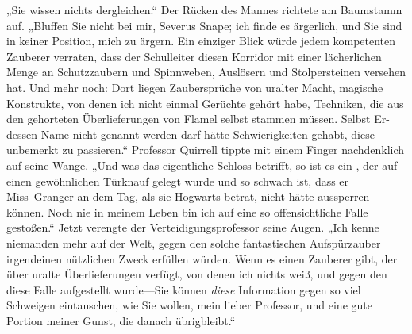 „Sie wissen nichts dergleichen.“ Der Rücken des Mannes richtete am Baumstamm auf. „Bluffen Sie nicht bei mir, Severus Snape; ich finde es ärgerlich, und Sie sind in keiner Position, mich zu ärgern. Ein einziger Blick würde jedem kompetenten Zauberer verraten, dass der Schulleiter diesen Korridor mit einer lächerlichen Menge an Schutzzaubern und Spinnweben, Auslösern und Stolpersteinen versehen hat. Und mehr noch: Dort liegen Zaubersprüche von uralter Macht, magische Konstrukte, von denen ich nicht einmal Gerüchte gehört habe, Techniken, die aus den gehorteten Überlieferungen von Flamel selbst stammen müssen. Selbst Er-dessen-Name-nicht-genannt-werden-darf hätte Schwierigkeiten gehabt, diese unbemerkt zu passieren.“ Professor Quirrell tippte mit einem Finger nachdenklich auf seine Wange. „Und was das eigentliche Schloss betrifft, so ist es ein , der auf einen gewöhnlichen Türknauf gelegt wurde und so schwach ist, dass er Miss~Granger an dem Tag, als sie Hogwarts betrat, nicht hätte aussperren können. Noch nie in meinem Leben bin ich auf eine so offensichtliche Falle gestoßen.“ Jetzt verengte der Verteidigungsprofessor seine Augen. „Ich kenne niemanden mehr auf der Welt, gegen den solche fantastischen Aufspürzauber irgendeinen nützlichen Zweck erfüllen würden. Wenn es einen Zauberer gibt, der über uralte Überlieferungen verfügt, von denen ich nichts weiß, und gegen den diese Falle aufgestellt wurde—Sie können \emph{diese} Information gegen so viel Schweigen eintauschen, wie Sie wollen, mein lieber Professor, und eine gute Portion meiner Gunst, die danach übrigbleibt.“


